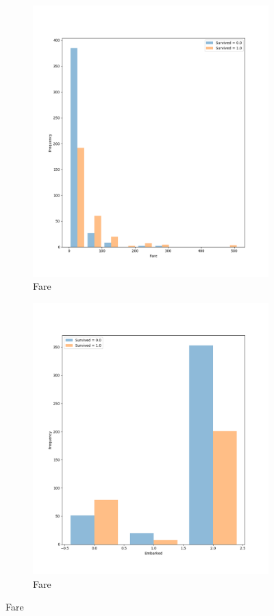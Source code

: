 \documentclass[11pt]{article}
\begin{document}
\begin{itemize}
\begin{enumerate}
\begin{figure}
\begin{subfigure}[b]{0.49\textwidth}
          \includegraphics[width=\textwidth]{figs/fare.png}
          \caption{Fare}
        \end{subfigure}

        \begin{subfigure}[b]{0.49\textwidth}
          \includegraphics[width=\textwidth]{figs/embarked.png}
          \caption{Fare}
        \end{subfigure}


\end{figure}
\end{enumerate}
\end{itemize}
\end{document}
